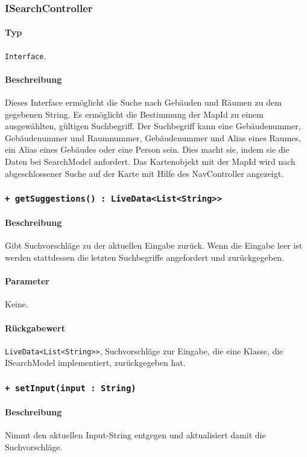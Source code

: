 \subsubsection{ISearchController}
\paragraph*{Typ}
\texttt{Interface}.
\paragraph*{Beschreibung}
Dieses Interface ermöglicht die Suche nach Gebäuden und Räumen zu dem gegebenen String. 
Es ermöglicht die Bestimmung der MapId zu einem ausgewählten, gültigen Suchbegriff. 
Der Suchbegriff kann eine Gebäudenummer, Gebäudenummer und Raumnummer, Gebäudenummer und Alias eines Raumes, ein Alias eines Gebäudes oder eine Person sein.
Dies macht sie, indem sie die Daten bei SearchModel anfordert.
Das Kartenobjekt mit der MapId wird nach abgeschlossener Suche auf der Karte mit Hilfe des NavController angezeigt.


\subsubsection*{\texttt{+ getSuggestions() : LiveData<List<String>>}}%
\paragraph*{Beschreibung}
Gibt Suchvorschläge zu der aktuellen Eingabe zurück.
Wenn die Eingabe leer ist werden stattdessen die letzten Suchbegriffe angefordert und zurückgegeben.
\paragraph*{Parameter}
Keine.
\paragraph*{Rückgabewert}
\texttt{LiveData<List<String>>}, Suchvorschläge zur Eingabe, die eine Klasse, die ISearchModel implementiert, zurückgegeben hat.

\subsubsection*{\texttt{+ setInput(input : String)}}%
\paragraph*{Beschreibung}
Nimmt den aktuellen Input-String entgegen und aktualisiert damit die Suchvorschläge.
